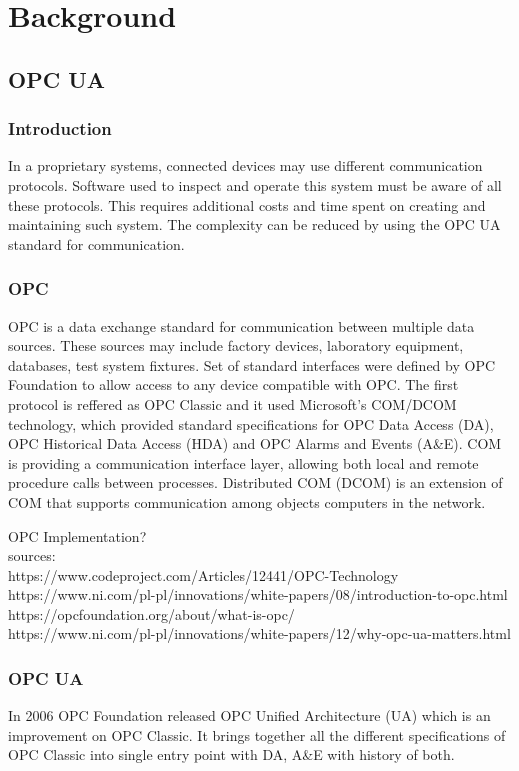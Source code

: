 \chapter{Background}
\section{OPC UA}
\subsection{Introduction}
In a proprietary systems, connected devices may use different communication protocols. Software used to inspect and operate this system must be aware of all these protocols. 
This requires additional costs and time spent on creating and maintaining such system. The complexity can be reduced by using the OPC UA standard for communication.

\subsection{OPC}
OPC is a data exchange standard for communication between multiple data sources. These sources may include factory devices, laboratory equipment, databases, test system fixtures. Set of standard interfaces were defined by OPC Foundation to allow access to any device compatible with OPC. 
The first protocol is reffered as OPC Classic and it used Microsoft's COM/DCOM technology, which provided standard specifications for OPC Data Access (DA), OPC Historical Data Access (HDA) and OPC Alarms and Events (A\&E). 
COM is providing a communication interface layer, allowing both local and remote procedure calls between processes. Distributed COM (DCOM) is an extension of COM that supports communication among objects computers in the network.

  {  
    \color{red}
    OPC Implementation?\\
    
    sources: \\
    https://www.codeproject.com/Articles/12441/OPC-Technology\\
    https://www.ni.com/pl-pl/innovations/white-papers/08/introduction-to-opc.html\\
    https://opcfoundation.org/about/what-is-opc/\\
    https://www.ni.com/pl-pl/innovations/white-papers/12/why-opc-ua-matters.html\\
  }
\subsection{OPC UA}
In 2006 OPC Foundation released OPC Unified Architecture (UA) which is an improvement on OPC Classic. It brings together all the different specifications of OPC Classic into single entry point with DA, A\&E with history of both.

